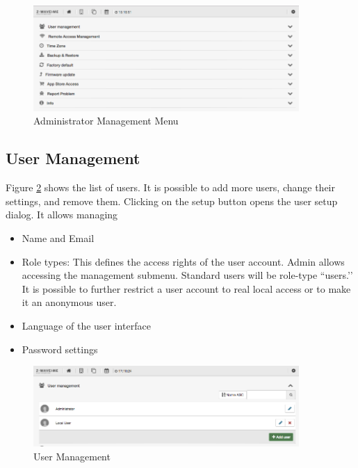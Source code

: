 \begin{figure}
\begin{center}
\includegraphics[width=0.9\textwidth]{pngs/cap4/shui91.png}
\caption{Administrator Management Menu}
\label{shui91}
\end{center}
\end{figure}

\subsection{User Management}


Figure \ref{shui71} shows the list of users. It is possible to add more users, change 
their settings, and remove them. Clicking on the setup button opens the user setup dialog. 
It allows managing

\begin{itemize}
\item Name and Email
\item Role types: This defines the access rights of the user account. Admin allows 
accessing the management submenu. Standard users will be role-type ``users.’’ It is 
possible to further restrict a user account to real local access or to make it an 
anonymous user.
\item Language of the user interface
\item Password settings
\end{itemize}

\begin{figure}
\begin{center}
\includegraphics[width=0.9\textwidth]{pngs/cap4/shui71.png}
\caption{User Management}
\label{shui71}
\end{center}
\end{figure}

